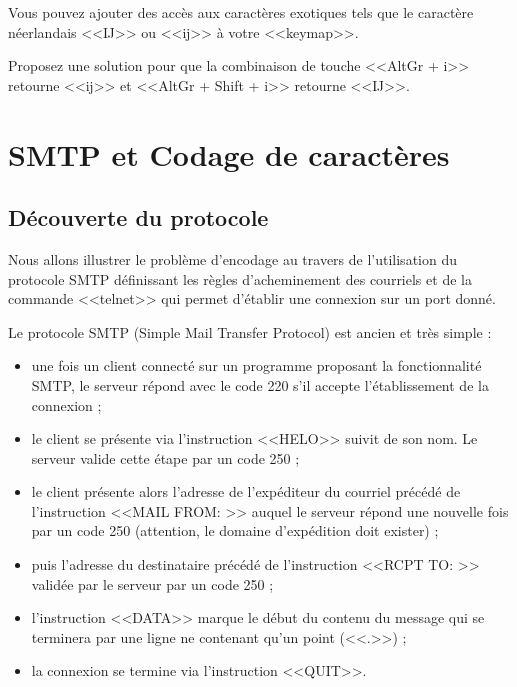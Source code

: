 \documentclass[11pt]{article}
\begin{document}
Vous pouvez ajouter des accès aux caractères exotiques tels que le caractère
néerlandais <<Ĳ>> ou <<ĳ>> à votre <<keymap>>. 

Proposez une solution pour que la combinaison de touche <<AltGr + i>> retourne
<<ĳ>> et <<AltGr + Shift + i>> retourne <<Ĳ>>.



\section{SMTP et Codage de caractères}

\subsection{Découverte du protocole}

Nous allons illustrer le problème d'encodage au travers de l'utilisation du
protocole SMTP définissant les règles d'acheminement des courriels et de la
commande <<telnet>> qui permet d'établir une connexion sur un port donné.

Le protocole SMTP (Simple Mail Transfer Protocol) est ancien et très simple :
\begin{itemize}

 \item une fois un client connecté sur un programme proposant la fonctionnalité
SMTP, le serveur répond avec le code 220 s'il accepte l'établissement de la
connexion ; 

 \item le client se présente via l'instruction <<HELO>> suivit de son nom. Le
serveur valide cette étape par un code 250 ;

 \item le client présente alors l'adresse de l'expéditeur du courriel précédé
de l'instruction <<MAIL FROM: >> auquel le serveur répond une nouvelle fois par
un code 250 (attention, le domaine d'expédition doit exister) ; 

 \item puis l'adresse du destinataire précédé de l'instruction <<RCPT TO: >>
validée par le serveur par un code 250 ; 

\item l'instruction <<DATA>> marque le début du contenu du message qui se
terminera par une ligne ne contenant qu'un point (<<.>>) ;

\item la connexion se termine via l'instruction <<QUIT>>.

\end{itemize}
\end{document}
